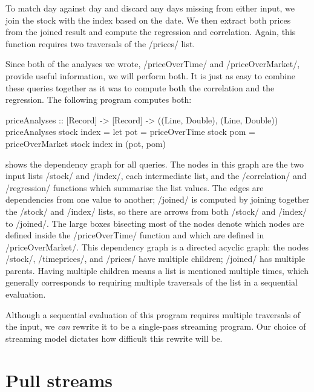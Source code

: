 To match day against day and discard any days missing from either input, we join the stock with the index based on the date.
We then extract both prices from the joined result and compute the regression and correlation.
Again, this function requires two traversals of the \Hs/prices/ list.

Since both of the analyses we wrote, \Hs/priceOverTime/ and \Hs/priceOverMarket/, provide useful information, we will perform both.
It is just as easy to combine these queries together as it was to compute both the correlation and the regression.
The following program computes both:

\begin{haskell}
priceAnalyses :: [Record] -> [Record] -> ((Line, Double), (Line, Double))
priceAnalyses stock index =
  let pot = priceOverTime   stock
      pom = priceOverMarket stock index
  in (pot, pom)
\end{haskell}



 shows the dependency graph for all queries.
The nodes in this graph are the two input lists \Hs/stock/ and \Hs/index/, each intermediate list, and the \Hs/correlation/ and \Hs/regression/ functions which summarise the list values.
The edges are dependencies from one value to another; \Hs/joined/ is computed by joining together the \Hs/stock/ and \Hs/index/ lists, so there are arrows from both \Hs/stock/ and \Hs/index/ to \Hs/joined/.
The large boxes bisecting most of the nodes denote which nodes are defined inside the \Hs/priceOverTime/ function and which are defined in \Hs/priceOverMarket/.
This dependency graph is a directed acyclic graph: the nodes \Hs/stock/, \Hs/timeprices/, and \Hs/prices/ have multiple children; \Hs/joined/ has multiple parents.
Having multiple children means a list is mentioned multiple times, which generally corresponds to requiring multiple traversals of the list in a sequential evaluation.

Although a sequential evaluation of this program requires multiple traversals of the input, we \emph{can} rewrite it to be a single-pass streaming program.
Our choice of streaming model dictates how difficult this rewrite will be.

\section{Pull streams}
\label{taxonomy/pull}

